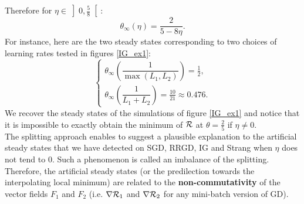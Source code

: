 \documentclass[article,authoryear,jmlmc]{beg_32}             %
\begin{document}
Therefore for $\eta \in \left]0,\frac{5}{8}\right[$:
\begin{equation*}
	\theta_{\infty} (\eta)= \dfrac{2}{5-8\eta}.
\end{equation*}
For instance, here are the two steady states corresponding to two choices of learning rates tested in figures \ref{IG_ex1}:
\begin{equation*}
	\left\{
	\begin{array}{ll}
		\theta_{\infty}\left(\dfrac{1}{\max(L_1,L_2)}\right) = \frac{1}{2}, \\
		\theta_{\infty}\left(\dfrac{1}{L_1+L_2}\right) = \frac{10}{21}\approx 0.476.
	\end{array}
	\right.
\end{equation*}
We recover the steady states of the simulations of figure \ref{IG_ex1} and notice that it is impossible to exactly obtain the minimum of $\mathcal{R}$ at $\theta=\frac{2}{5}$ if $\eta \neq 0$. \\
The splitting approach enables to suggest a plausible explanation to the artificial steady states that we have detected on SGD, RRGD, IG and Strang when $\eta$ does not tend to 0.
Such a phenomenon is called an imbalance of the splitting. Therefore, the artificial steady states (or the predilection towards the interpolating local minimum) are related to the
\textbf{non-commutativity} of the vector fields $F_1$ and $F_2$ (i.e. $\nabla \mathcal{R}_1$ and $\nabla \mathcal{R}_2$ for any mini-batch version of GD). 
\end{document}
